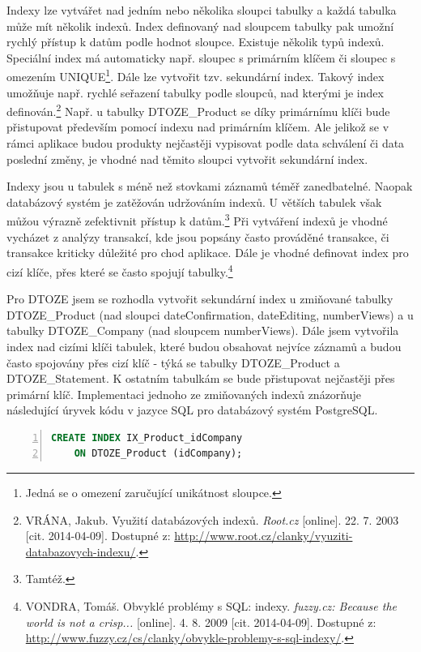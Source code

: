 \documentclass[11pt,a4paper]{article}
\begin{document}
Indexy lze vytvářet nad jedním nebo několika sloupci tabulky a každá tabulka může mít několik indexů. Index definovaný nad sloupcem tabulky pak umožní rychlý přístup k datům podle hodnot sloupce. Existuje několik typů indexů. Speciální index má automaticky např. sloupec s primárním klíčem či sloupec s omezením UNIQUE\footnote{Jedná se o omezení zaručující unikátnost sloupce.}. Dále lze vytvořit tzv. sekundární index. Takový index umožňuje např. rychlé seřazení tabulky podle sloupců, nad kterými je index definován.\footnote{VRÁNA, Jakub. Využití databázových indexů. \textit{Root.cz} [online]. 22. 7. 2003 [cit. 2014-04-09]. Dostupné z: \url{http://www.root.cz/clanky/vyuziti-databazovych-indexu/}.} Např. u tabulky DTOZE\_Product se díky primárnímu klíči bude přistupovat především pomocí indexu nad primárním klíčem. Ale jelikož se v rámci aplikace budou produkty nejčastěji vypisovat podle data schválení či data poslední změny, je vhodné nad těmito sloupci vytvořit sekundární index.

Indexy jsou u tabulek s méně než stovkami záznamů téměř zanedbatelné. Naopak databázový systém je zatěžován udržováním indexů. U větších tabulek však můžou výrazně zefektivnit přístup k datům.\footnote{Tamtéž.} Při vytváření indexů je vhodné vycházet z analýzy transakcí, kde jsou popsány často prováděné transakce, či transakce kriticky důležité pro chod aplikace. Dále je vhodné definovat index pro cizí klíče, přes které se často spojují tabulky.\footnote{VONDRA, Tomáš. Obvyklé problémy s SQL: indexy. \textit{fuzzy.cz: Because the world is not a crisp...} [online]. 4. 8. 2009 [cit. 2014-04-09]. Dostupné z: \url{http://www.fuzzy.cz/cs/clanky/obvykle-problemy-s-sql-indexy/}.}

Pro DTOZE jsem se rozhodla vytvořit sekundární index u zmiňované tabulky DTOZE\_Product (nad sloupci dateConfirmation, dateEditing, numberViews) a u tabulky DTOZE\_Company (nad sloupcem numberViews). Dále jsem vytvořila index nad cizími klíči tabulek, které budou obsahovat nejvíce záznamů a budou často spojovány přes cizí klíč - týká se tabulky DTOZE\_Product a DTOZE\_Statement. K ostatním tabulkám se bude přistupovat nejčastěji přes primární klíč. Implementaci jednoho ze zmiňovaných indexů znázorňuje následující úryvek kódu v jazyce SQL pro databázový systém PostgreSQL.  

\vspace{0.3cm}
\begin{lstlisting}[language=SQL, label=DescriptiveLabel, backgroundcolor=\color{grey}, numbers=left, basicstyle=\footnotesize]
CREATE INDEX IX_Product_idCompany
	ON DTOZE_Product (idCompany);
\end{lstlisting}
\vspace{0.3cm}
\end{document}
